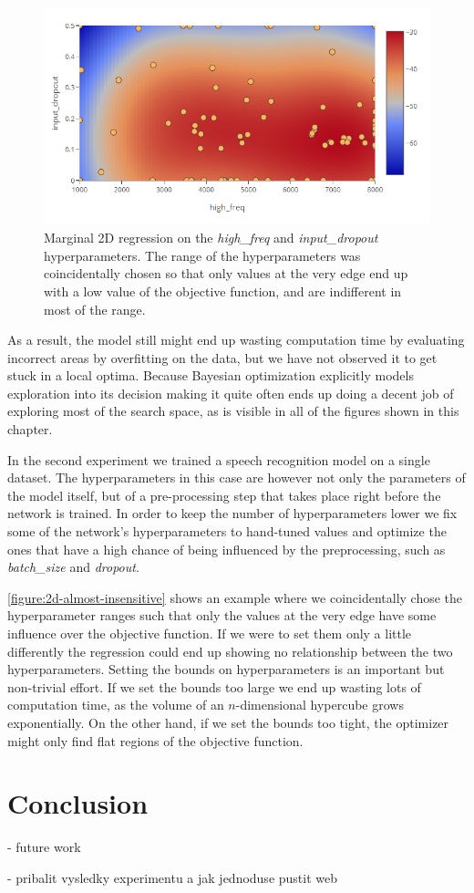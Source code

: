 \begin{figure}
	\begin{center}
		\includegraphics[width=1.0\textwidth]{images/2d-almost-insensitive.png}
		\caption{Marginal 2D regression on the \emph{high\_freq} and \emph{input\_dropout} hyperparameters. The range of the hyperparameters was coincidentally chosen so that only values at the very edge end up with a low value of the objective function, and are indifferent in most of the range.}
		\label{figure:2d-almost-insensitive}
	\end{center}
\end{figure}


As a result, the model still might end up wasting computation time by evaluating incorrect areas by overfitting on the data, but we have not observed it to get stuck in a local optima. Because Bayesian optimization explicitly models exploration into its decision making it quite often ends up doing a decent job of exploring most of the search space, as is visible in all of the figures shown in this chapter.

In the second experiment we trained a speech recognition model on a single dataset. The hyperparameters in this case are however not only the parameters of the model itself, but of a pre-processing step that takes place right before the network is trained. In order to keep the number of hyperparameters lower we fix some of the network's hyperparameters to hand-tuned values and optimize the ones that have a high chance of being influenced by the preprocessing, such as \emph{batch\_size} and \emph{dropout}.

\autoref{figure:2d-almost-insensitive} shows an example where we coincidentally chose the hyperparameter ranges such that only the values at the very edge have some influence over the objective function. If we were to set them only a little differently the regression could end up showing no relationship between the two hyperparameters. Setting the bounds on hyperparameters is an important but non-trivial effort. If we set the bounds too large we end up wasting lots of computation time, as the volume of an $n$-dimensional hypercube grows exponentially. On the other hand, if we set the bounds too tight, the optimizer might only find flat regions of the objective function.




\chapter{Conclusion}

- future work

- pribalit vysledky experimentu a jak jednoduse pustit web

